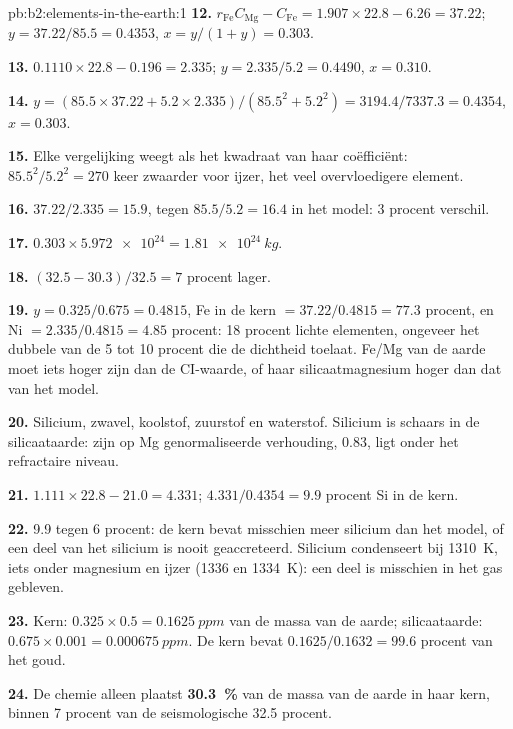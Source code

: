\begin{solution}{pb:b2:elements-in-the-earth:1}
\textbf{12.} $r_{\mathrm{Fe}}C_{\mathrm{Mg}} - C_{\mathrm{Fe}} = 1.907\times22.8 - 6.26 =
37.22$; $y = 37.22/85.5 = 0.4353$, $x = y/(1+y) = 0.303$.

\textbf{13.} $0.1110\times22.8 - 0.196 = 2.335$; $y = 2.335/5.2 = 0.4490$, $x = 0.310$.

\textbf{14.} $y = (85.5\times37.22 + 5.2\times2.335)/(85.5^2 + 5.2^2) =
3194.4/7337.3 = 0.4354$, $x = 0.303$.

\textbf{15.} Elke vergelijking weegt als het kwadraat van haar coëfficiënt: $85.5^2/5.2^2 = 270$
keer zwaarder voor ijzer, het veel overvloedigere element.

\textbf{16.} $37.22/2.335 = 15.9$, tegen $85.5/5.2 = 16.4$ in het model: 3 procent
verschil.

\textbf{17.} $0.303\times\num{5.972e24} = \qty{1.81e24}{kg}$.

\textbf{18.} $(32.5-30.3)/32.5 = 7$ procent lager.

\textbf{19.} $y = 0.325/0.675 = 0.4815$, Fe in de kern $= 37.22/0.4815 = 77.3$ procent,
en Ni $= 2.335/0.4815 = 4.85$ procent: 18 procent lichte elementen, ongeveer het dubbele van de 5 tot
10 procent die de dichtheid toelaat. Fe/Mg van de aarde moet iets hoger zijn dan de CI-waarde,
of haar silicaatmagnesium hoger dan dat van het model.

\textbf{20.} Silicium, zwavel, koolstof, zuurstof en waterstof. Silicium is schaars in de
silicaataarde: zijn op Mg genormaliseerde verhouding, 0.83, ligt onder het refractaire niveau.

\textbf{21.} $1.111\times22.8 - 21.0 = 4.331$; $4.331/0.4354 = 9.9$ procent Si in de
kern.

\textbf{22.} 9.9 tegen 6 procent: de kern bevat misschien meer silicium dan het model, of
een deel van het silicium is nooit geaccreteerd. Silicium condenseert bij \qty{1310}{K}, iets
onder magnesium en ijzer (1336 en \qty{1334}{K}): een deel is misschien in het gas gebleven.

\textbf{23.} Kern: $0.325\times0.5 = \qty{0.1625}{ppm}$ van de massa van de aarde; silicaataarde:
$0.675\times0.001 = \qty{0.000675}{ppm}$. De kern bevat
$0.1625/0.1632 = 99.6$ procent van het goud.

\textbf{24.} De chemie alleen plaatst
\textbf{\qty[text-series-to-math=true]{30.3}{\percent}} van de massa van de aarde in haar kern,
binnen 7 procent van de seismologische 32.5 procent.
\end{solution}
